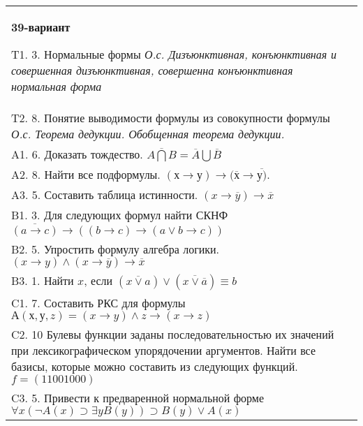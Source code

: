 \documentclass{article}
\begin{document}
\begin{tabular}{m{17cm}}
\textbf{39-вариант}
\newline

T1. 3. Нормальные формы \emph{О.с. Дизъюнктивная, конъюнктивная и совершенная дизъюнктивная, совершенна конъюнктивная нормальная форма} \\
T2. 8. Понятие выводимости формулы из совокупности формулы \emph{О.с. Теорема дедукции. Обобщенная теорема дедукции.} \\
A1. 6. Доказать тождество. \(\overline{A\bigcap B} = \overline{A}\bigcup\overline{B}\) \\
A2. 8. Найти все подформулы. \((х \rightarrow у) \rightarrow (\overline{х} \rightarrow \overline{у)}\). \\
A3. 5. Составить таблица истинности. \((x \rightarrow \overline{y}) \rightarrow \overline{x}\) \\
B1. 3. Для следующих формул найти СКНФ \(\overline{(a \rightarrow c)} \rightarrow \left( (b \rightarrow c) \rightarrow (a \vee b \rightarrow c) \right)\) \\
B2. 5. Упростить формулу алгебра логики. \((x \rightarrow y) \land (x \rightarrow \overline{y}) \rightarrow \overline{x}\) \\
B3. 1. Найти \(x\), если \(\left( \overline{x \vee a} \right) \vee \left( \overline{x \vee \overline{a}} \right) \equiv b\) \\
C1. 7. Составить РКС для формулы \(А(х,у,z) = (x \rightarrow y) \land z \rightarrow (x \rightarrow z)\) \\
C2. 10 Булевы функции заданы последовательностью их значений при лексикографическом упорядочении аргументов. Найти все базисы, которые можно составить из следующих функций. \(f = (11001000)\) \\
C3. 5. Привести к предваренной нормальной форме \(\forall x(\neg A(x) \supset \exists yB(y)) \supset B(y) \vee A(x)\) \\

\end{tabular}
\vspace{1cm}
\end{document}
